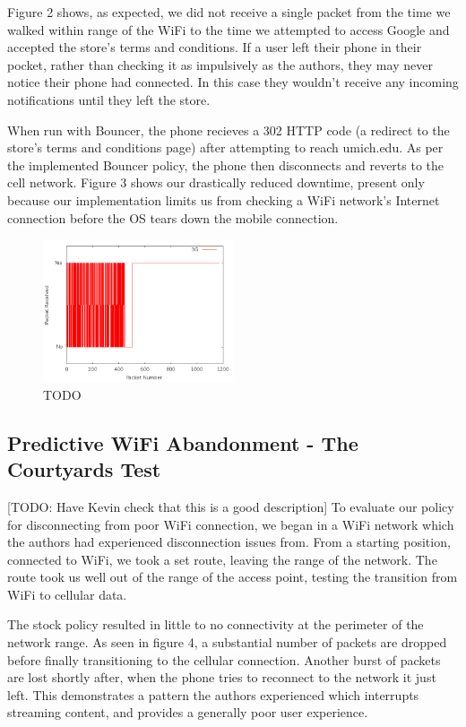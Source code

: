 Figure 2 shows, as expected, we did not receive a single packet from the time we walked within range of the WiFi to the time we attempted to access Google and accepted the store's terms and conditions. If a user left their phone in their pocket, rather than checking it as impulsively as the authors, they may never notice their phone had connected. In this case they wouldn't receive any incoming notifications until they left the store.

When run with Bouncer, the phone recieves a 302 HTTP code (a redirect to the store's terms and conditions page) after attempting to reach umich.edu. As per the implemented Bouncer policy, the phone then disconnects and reverts to the cell network. Figure 3 shows our drastically reduced downtime, present only because our implementation limits us from checking a WiFi network's Internet connection before the OS tears down the mobile connection.

\begin{figure}
	\includegraphics[width=0.5\textwidth]{paneraWithPolicy}
	\caption{TODO}
\end{figure}

\subsection{Predictive WiFi Abandonment - The Courtyards Test}
[TODO: Have Kevin check that this is a good description]
To evaluate our policy for disconnecting from poor WiFi connection, we began in a WiFi network which the authors had experienced disconnection issues from. From a starting position, connected to WiFi, we took a set route, leaving the range of the network. The route took us well out of the range of the access point, testing the transition from WiFi to cellular data.

The stock policy resulted in little to no connectivity at the perimeter of the network range. As seen in figure 4, a substantial number of packets are dropped before finally transitioning to the cellular connection. Another burst of packets are lost shortly after, when the phone tries to reconnect to the network it just left. This demonstrates a pattern the authors experienced which interrupts streaming content, and provides a generally poor user experience.

